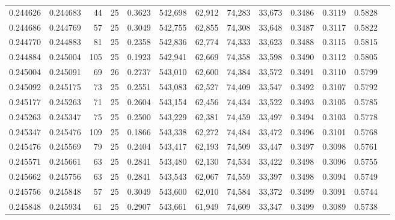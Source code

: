 \begin{tabular}{rrrrrrrrrrrrr}
0.244626 & 0.244683 &    44 &  25 &                                     0.3623 & 542,698 &  62,912 &  74,283 &  33,673 & 0.3486 & 0.3119 & 0.5828 \\
0.244686 & 0.244769 &    57 &  25 &                                     0.3049 & 542,755 &  62,855 &  74,308 &  33,648 & 0.3487 & 0.3117 & 0.5822 \\
0.244770 & 0.244883 &    81 &  25 &                                     0.2358 & 542,836 &  62,774 &  74,333 &  33,623 & 0.3488 & 0.3115 & 0.5815 \\
0.244884 & 0.245004 &   105 &  25 &                                     0.1923 & 542,941 &  62,669 &  74,358 &  33,598 & 0.3490 & 0.3112 & 0.5805 \\
0.245004 & 0.245091 &    69 &  26 &                                     0.2737 & 543,010 &  62,600 &  74,384 &  33,572 & 0.3491 & 0.3110 & 0.5799 \\
0.245092 & 0.245175 &    73 &  25 &                                     0.2551 & 543,083 &  62,527 &  74,409 &  33,547 & 0.3492 & 0.3107 & 0.5792 \\
0.245177 & 0.245263 &    71 &  25 &                                     0.2604 & 543,154 &  62,456 &  74,434 &  33,522 & 0.3493 & 0.3105 & 0.5785 \\
0.245263 & 0.245347 &    75 &  25 &                                     0.2500 & 543,229 &  62,381 &  74,459 &  33,497 & 0.3494 & 0.3103 & 0.5778 \\
0.245347 & 0.245476 &   109 &  25 &                                     0.1866 & 543,338 &  62,272 &  74,484 &  33,472 & 0.3496 & 0.3101 & 0.5768 \\
0.245476 & 0.245569 &    79 &  25 &                                     0.2404 & 543,417 &  62,193 &  74,509 &  33,447 & 0.3497 & 0.3098 & 0.5761 \\
0.245571 & 0.245661 &    63 &  25 &                                     0.2841 & 543,480 &  62,130 &  74,534 &  33,422 & 0.3498 & 0.3096 & 0.5755 \\
0.245662 & 0.245756 &    63 &  25 &                                     0.2841 & 543,543 &  62,067 &  74,559 &  33,397 & 0.3498 & 0.3094 & 0.5749 \\
0.245756 & 0.245848 &    57 &  25 &                                     0.3049 & 543,600 &  62,010 &  74,584 &  33,372 & 0.3499 & 0.3091 & 0.5744 \\
0.245848 & 0.245934 &    61 &  25 &                                     0.2907 & 543,661 &  61,949 &  74,609 &  33,347 & 0.3499 & 0.3089 & 0.5738 \\

\end{tabular}
